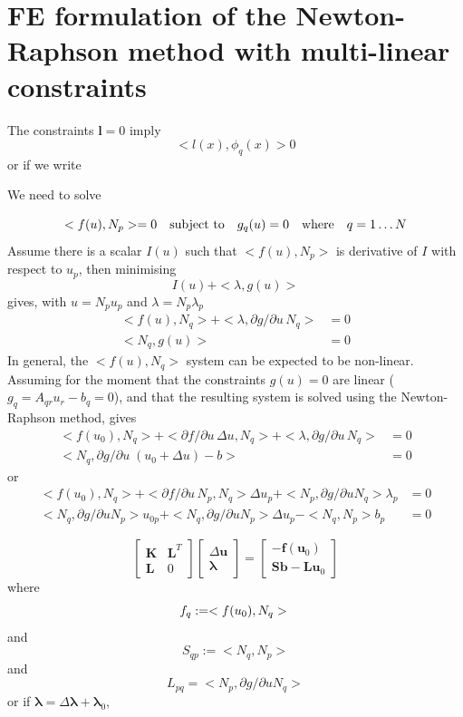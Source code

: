 \documentclass[10pt,a4paper]{book}
\newcommand{\p}{\partial}
\begin{document}
\section{FE formulation of the Newton-Raphson method with multi-linear constraints}



The constraints $\bm{l}=0$ imply
\[
   <l(x),\phi_q(x)> 0
\]
or if we write



We need to solve 

\[
<f(u),N_p>=0 \quad \hbox{subject to} \quad g_q(u)=0 \quad \hbox{where} \quad  q=1\ldots N
\]
Assume there is a scalar $I(u)$ such that $<f(u),N_p>$ is derivative
of $I$ with respect to $u_p$, then minimising
\[
I(u)+<\lambda,g(u)>
\]
gives, with $u=N_p u_p$ and $\lambda=N_p \lambda_p $
\begin{align}
<f(u),N_q>+<\lambda,\p g/\p u \, N_q>&=0\\
<N_q,g(u)>&=0
\end{align}
In general, the $<f(u),N_q>$ system can be expected to be non-linear. Assuming
for the moment that the constraints $g(u)=0$ are linear  ($g_q=A_{qr}
u_r-b_q=0$), and that the resulting system is solved using the Newton-Raphson method, gives
\begin{align}
<f(u_0),N_q>+<\p f/\p u \, \Delta u, N_q> + <\lambda, \p g /\p u \, N_q>&=0\\
<N_q,\p g / \p u \; (u_0+\Delta u)-b>&=0
\end{align}
or
\begin{align}
<f(u_0),N_q>+<\p f/\p u \, N_p , N_q> \Delta u_p+ <N_p,\p g/\p u N_q> \lambda_p&=0\\
<N_q,\p g / \p u  N_p > u_{0p} + < N_q , \p g /\p u N_p > \Delta u_p- <N_q,N_p> b_p&=0
\end{align}

\[
\left [ \begin{array}{cc}
\bm{K} & \bm{L}^T  \\
\bm{L} & 0 
\end{array} \right ]
\left [ \begin{array}{c}
\Delta \bm{u} \\
\bm{\lambda}
\end{array} \right ]
=\left [ \begin{array}{c}
-\bm{f}(\bm{u}_0) \\
\bm{S} \bm{b} - \bm{L} \bm{u}_0
\end{array} \right ]
\]
where
\[
f_{q}:=<f(u_0), N_q> \\
\]
and
\[
S_{qp}:= < N_q, N_p>
\]
and
\[
L_{pq}=<N_p,\p g/\p u N_q>
\]
or if $\bm{\lambda}=\Delta \bm{\lambda}+\bm{\lambda}_0$, 
\end{document}
